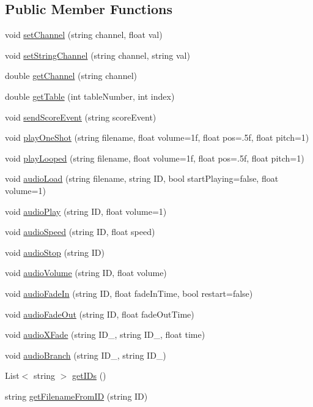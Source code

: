 \subsection*{Public Member Functions}
\begin{DoxyCompactItemize}
\item 
void \hyperlink{class_csound_unity_afebc3022044ed76890504f9601e4ff12}{set\+Channel} (string channel, float val)
\item 
void \hyperlink{class_csound_unity_aae79884a11e16fecbe2cec0f4ba654ed}{set\+String\+Channel} (string channel, string val)
\item 
double \hyperlink{class_csound_unity_a3cfa402f674514c29185c920a0dd06c4}{get\+Channel} (string channel)
\item 
double \hyperlink{class_csound_unity_aa8172640715fda16afb2765896cb63d8}{get\+Table} (int table\+Number, int index)
\item 
void \hyperlink{class_csound_unity_a9dbf630b9ddb22f4ff3b2c7421a61f16}{send\+Score\+Event} (string score\+Event)
\item 
void \hyperlink{class_csound_unity_a3333c1b0ade93b6fa883cf367fafa694}{play\+One\+Shot} (string filename, float volume=1f, float pos=.\+5f, float pitch=1)
\item 
void \hyperlink{class_csound_unity_a5a4c2a7370fb91d2cff05920a279b977}{play\+Looped} (string filename, float volume=1f, float pos=.\+5f, float pitch=1)
\item 
void \hyperlink{class_csound_unity_a5c571bca9cfc3628f977a16c2d56a48f}{audio\+Load} (string filename, string I\+D, bool start\+Playing=false, float volume=1)
\item 
void \hyperlink{class_csound_unity_a64d2ae9a76b8a1561434c190f40ae59e}{audio\+Play} (string I\+D, float volume=1)
\item 
void \hyperlink{class_csound_unity_a8ec213294d8f20ef60a30f7394ab87a3}{audio\+Speed} (string I\+D, float speed)
\item 
void \hyperlink{class_csound_unity_aee52d0bf0fd0fe5bb82ed0d5023a336c}{audio\+Stop} (string I\+D)
\item 
void \hyperlink{class_csound_unity_a2ab26a0009e493cb72c940f4e637b442}{audio\+Volume} (string I\+D, float volume)
\item 
void \hyperlink{class_csound_unity_a06dc602c5c56cc4a2c70f32c836b21cb}{audio\+Fade\+In} (string I\+D, float fade\+In\+Time, bool restart=false)
\item 
void \hyperlink{class_csound_unity_ae42e6f64776348f3eee0c6458f053972}{audio\+Fade\+Out} (string I\+D, float fade\+Out\+Time)
\item 
void \hyperlink{class_csound_unity_aeaa6ea32c9a7903471a1f65238fc40ee}{audio\+X\+Fade} (string I\+D\+\_, string I\+D\+\_, float time)
\item 
void \hyperlink{class_csound_unity_a91ce642f08df0b6612beed99120cf526}{audio\+Branch} (string I\+D\+\_, string I\+D\+\_)
\item 
List$<$ string $>$ \hyperlink{class_csound_unity_af3c884b51737a45ef70ea841d0d05843}{get\+I\+Ds} ()
\item 
string \hyperlink{class_csound_unity_a3e02f546264a98d51fd1f8cdb3fd462d}{get\+Filename\+From\+I\+D} (string I\+D)
\end{DoxyCompactItemize}
